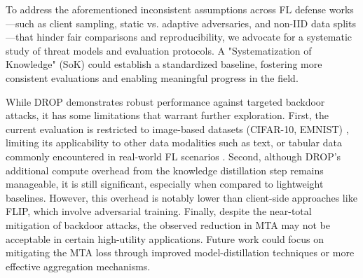 To address the aforementioned inconsistent assumptions across FL defense works—such as client sampling, static vs. adaptive adversaries, and non-IID data splits—that hinder fair comparisons and reproducibility, we advocate for a systematic study of threat models and evaluation protocols. A "Systematization of Knowledge" (SoK) could establish a standardized baseline, fostering more consistent evaluations and enabling meaningful progress in the field.

 While DROP demonstrates robust performance against targeted backdoor attacks, it has some limitations that warrant further exploration. First, the current evaluation is restricted to image-based datasets (CIFAR-10, EMNIST) , limiting its applicability to other data modalities such as text, or tabular data commonly encountered in real-world FL scenarios . Second, although DROP’s additional compute overhead from the knowledge distillation step remains manageable, it is still significant, especially when compared to lightweight baselines. However, this overhead is notably lower than client-side approaches like FLIP, which involve adversarial training. Finally, despite the near-total mitigation of backdoor attacks, the observed reduction in MTA may not be acceptable in certain high-utility applications. Future work could focus on mitigating the MTA loss through improved model-distillation techniques or more effective aggregation mechanisms.
